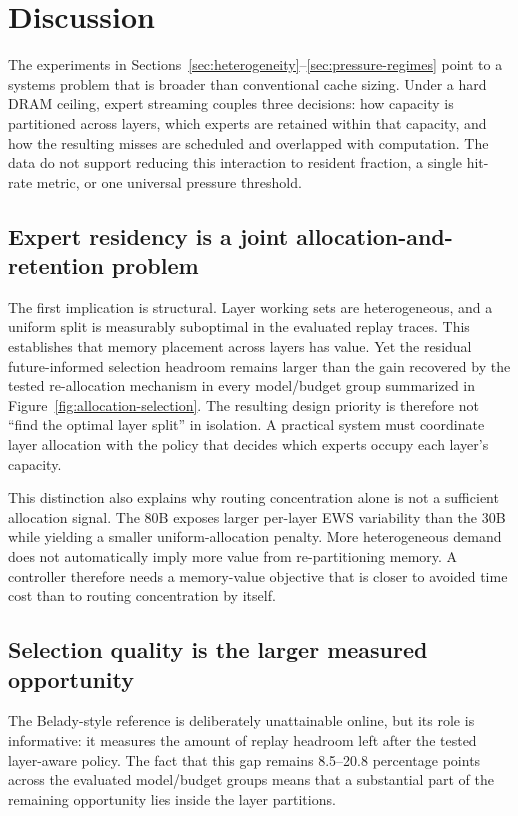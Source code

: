 \section{Discussion}
\label{sec:discussion}

The experiments in Sections~\ref{sec:heterogeneity}--\ref{sec:pressure-regimes} point to a systems problem that is broader than conventional cache sizing. Under a hard DRAM ceiling, expert streaming couples three decisions: how capacity is partitioned across layers, which experts are retained within that capacity, and how the resulting misses are scheduled and overlapped with computation. The data do not support reducing this interaction to resident fraction, a single hit-rate metric, or one universal pressure threshold.

\subsection{Expert residency is a joint allocation-and-retention problem}

The first implication is structural. Layer working sets are heterogeneous, and a uniform split is measurably suboptimal in the evaluated replay traces. This establishes that memory placement across layers has value. Yet the residual future-informed selection headroom remains larger than the gain recovered by the tested re-allocation mechanism in every model/budget group summarized in Figure~\ref{fig:allocation-selection}. The resulting design priority is therefore not ``find the optimal layer split'' in isolation. A practical system must coordinate layer allocation with the policy that decides which experts occupy each layer's capacity.

This distinction also explains why routing concentration alone is not a sufficient allocation signal. The 80B exposes larger per-layer EWS variability than the 30B while yielding a smaller uniform-allocation penalty. More heterogeneous demand does not automatically imply more value from re-partitioning memory. A controller therefore needs a memory-value objective that is closer to avoided time cost than to routing concentration by itself.

\subsection{Selection quality is the larger measured opportunity}

The Belady-style reference is deliberately unattainable online, but its role is informative: it measures the amount of replay headroom left after the tested layer-aware policy. The fact that this gap remains 8.5--20.8 percentage points across the evaluated model/budget groups means that a substantial part of the remaining opportunity lies inside the layer partitions.

